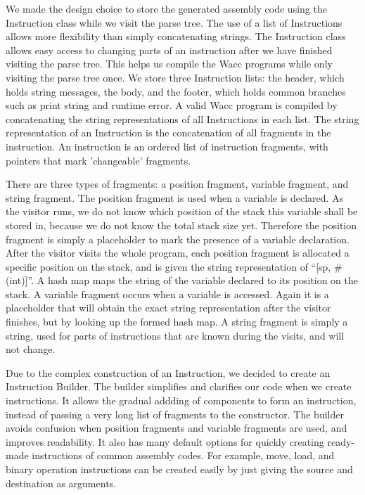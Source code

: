 \documentclass[11pt]{article}
\begin{document}
We made the design choice to store the generated assembly code using the Instruction class while we visit the parse tree. The use of a list of Instructions allows more flexibility than simply concatenating strings. The Instruction class allows easy access to changing parts of an instruction after we have finished visiting the parse tree. This helps us compile the Wacc programs while only visiting the parse tree once. We store three Instruction lists: the header, which holds string messages, the body, and the footer, which holds common branches such as print string and runtime error. A valid Wacc program is compiled by concatenating the string representations of all Instructions in each list. The string representation of an Instruction is the concatenation of all fragments in the instruction. An instruction is an ordered list of instruction fragments, with pointers that mark 'changeable' fragments. 

\medskip

There are three types of fragments: a position fragment, variable fragment, and string fragment. The position fragment is used when a variable is declared. As the visitor runs, we do not know which position of the stack this variable shall be stored in, because we do not know the total stack size yet. Therefore the position fragment is simply a placeholder to mark the presence of a variable declaration. After the visitor visits the whole program, each position fragment is allocated a specific position on the stack, and is given the string representation of ``[sp, \#(int)]''. A hash map maps the string of the variable declared to its position on the stack. A variable fragment occurs when a variable is accessed. Again it is a placeholder that will obtain the exact string representation after the visitor finishes, but by looking up the formed hash map. A string fragment is simply a string, used for parts of instructions that are known during the visits, and will not change.

\medskip

Due to the complex construction of an Instruction, we decided to create an Instruction Builder. The builder simplifies and clarifies our code when we create instructions. It allows the gradual addding of components to form an instruction, instead of passing a very long list of fragments to the constructor. The builder avoids confusion when position fragments and variable fragments are used, and improves readability. It also has many default options for quickly creating ready-made instructions of common assembly codes. For example, move, load, and binary operation instructions can be created easily by just giving the source and destination as arguments.
\end{document}
